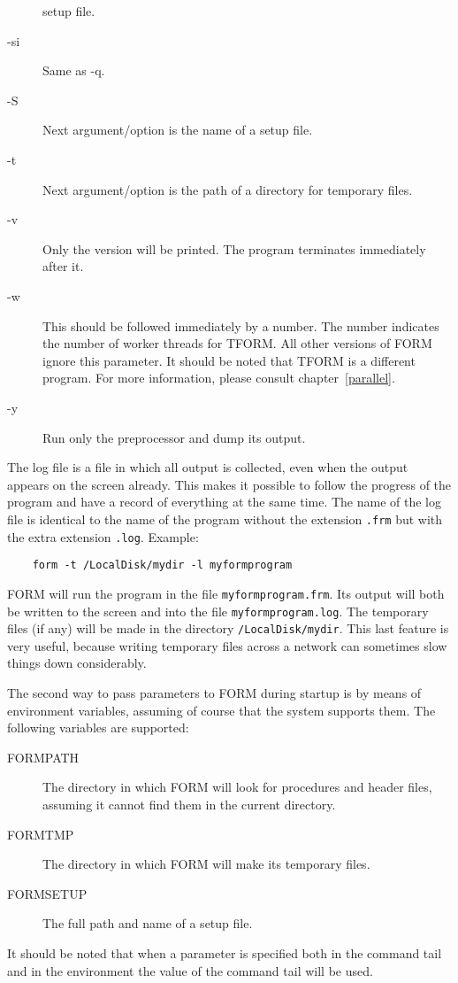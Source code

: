 \begin{description}
     setup file.
\item[-si] Same as -q.
\item[-S] Next argument/option is the name of a setup file.
\item[-t] Next argument/option is the path of a directory for temporary files.
\item[-v] Only the version will be printed. The program terminates 
     immediately after it.
\item[-w] This should be followed immediately by a number. The 
     number indicates the number of worker threads for TFORM. All other 
     versions of FORM ignore this parameter. It should be noted that TFORM 
     is a different program. For more information, please consult 
     chapter~\ref{parallel}.
\item[-y] Run only the preprocessor and dump its output.
\end{description}

\noindent The log file is a file in which all 
output is collected, even when the output appears on the screen already. 
This makes it possible to follow the progress of the program and have a 
record of everything at the same time. The name of the log file is 
identical to the name of the program without the extension \verb:.frm: but 
with the extra extension \verb:.log:.
Example:
\begin{center}
\begin{verbatim}
	form -t /LocalDisk/mydir -l myformprogram
\end{verbatim}
\end{center}
FORM will run the program in the file \verb:myformprogram.frm:. Its output 
will both be written to the screen and into the file 
\verb:myformprogram.log:. The temporary files (if any) will be made in the 
directory \verb:/LocalDisk/mydir:. This last feature is very useful, 
because writing temporary files across a network can sometimes slow things 
down considerably.

The second way to pass parameters to FORM during startup is by means of 
environment variables, assuming of course that 
the system supports them. The following variables are supported:
\begin{description}
\item[FORMPATH] The directory in which FORM will look for 
procedures and header files, assuming it cannot find them in the current 
directory.
\item[FORMTMP] The directory in which FORM will make its 
temporary files.
\item[FORMSETUP] The full path and name of a setup 
file.
\end{description}
It should be noted that when a parameter is specified both in the command 
tail and in the environment the value of the command tail will be used.

